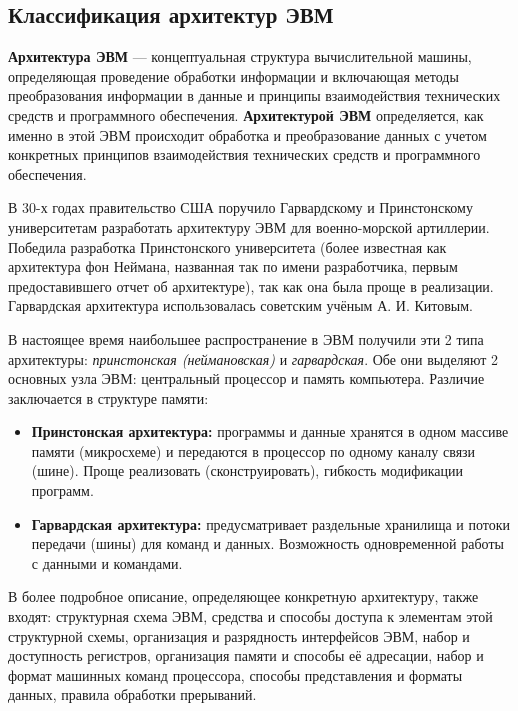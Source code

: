 \subsection{Классификация архитектур ЭВМ}\label{subsec:evm-classification}

\textbf{Архитектура ЭВМ} --- концептуальная структура вычислительной машины, определяющая проведение обработки информации и включающая методы преобразования информации в данные и принципы взаимодействия технических средств и программного обеспечения.
\textbf{Архитектурой ЭВМ} определяется, как именно в этой ЭВМ происходит обработка и преобразование данных с учетом конкретных принципов взаимодействия технических средств и программного обеспечения.

В 30-х годах правительство США поручило Гарвардскому и Принстонскому университетам разработать архитектуру ЭВМ для военно-морской артиллерии.
Победила разработка Принстонского университета (более известная как архитектура фон Неймана, названная так по имени разработчика, первым предоставившего отчет об архитектуре), так как она была проще в реализации.
Гарвардская архитектура использовалась советским учёным А. И. Китовым.

В настоящее время наибольшее распространение в ЭВМ получили эти 2 типа архитектуры: \emph{принстонская (неймановская)} и \emph{гарвардская}.
Обе они выделяют 2 основных узла ЭВМ: центральный процессор и память компьютера.
Различие заключается в структуре памяти:
\begin{itemize}
    \item \textbf{Принстонская архитектура:} программы и данные хранятся в одном массиве памяти (микросхеме) и передаются в процессор по одному каналу связи (шине). Проще реализовать (сконструировать), гибкость модификации программ.
    \item \textbf{Гарвардская архитектура:} предусматривает раздельные хранилища и потоки передачи (шины) для команд и данных. Возможность одновременной работы с данными и командами.
\end{itemize}

В более подробное описание, определяющее конкретную архитектуру, также входят: структурная схема ЭВМ, средства и способы доступа к элементам этой структурной схемы, организация и разрядность интерфейсов ЭВМ, набор и доступность регистров, организация памяти и способы её адресации, набор и формат машинных команд процессора, способы представления и форматы данных, правила обработки прерываний.

